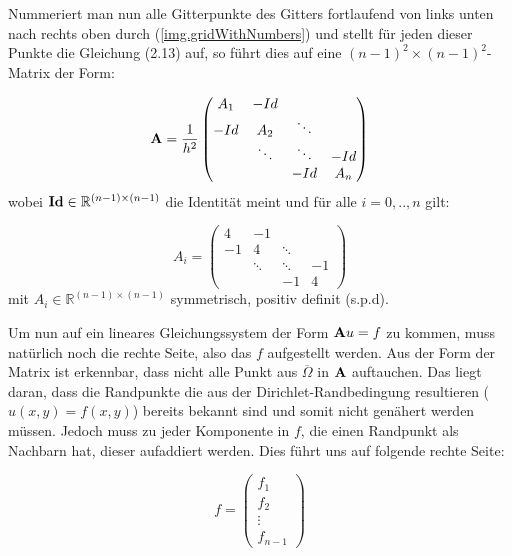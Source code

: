 \label{img.5-Point-Star}

\label{img.gridWithNumbers}

Nummeriert man nun alle Gitterpunkte des Gitters fortlaufend von links unten nach rechts oben durch (\autoref{img.gridWithNumbers}) und stellt für jeden dieser Punkte die Gleichung (2.13) auf, so führt dies auf eine $(n-1)^{2} \times (n-1)^{2}$-Matrix der Form:

\begin{equation}
{\textbf{A}} = \frac {1} {h^{2}}
\begin{pmatrix}
A_{1} & -Id \\
-Id & A_{2} & \ddots \\
 & \ddots & \ddots & -Id \\
 & & -Id & A_{n}
\end{pmatrix}
\end{equation}
wobei ${\textbf{Id}} \in \mathbb{R}^{(n-1) \times (n-1)}$ die Identität meint und für alle $i = 0,..,n$ gilt:

\begin{equation}
A_{i} = 
\begin{pmatrix}
4 & -1 & & \\
-1 & 4 & \ddots & \\
 & \ddots & \ddots & -1 \\
 & & -1 & 4
\end{pmatrix}
\end{equation}
mit $A_{i} \in \mathbb{R}^{(n-1) \times (n-1)}$ symmetrisch, positiv definit (s.p.d).

Um nun auf ein lineares Gleichungssystem der Form ${\textbf{A}}u = f$ zu kommen, muss natürlich noch die rechte Seite, also das $f$ aufgestellt werden. Aus der Form der Matrix ist erkennbar, dass nicht alle Punkt aus $\overline \Omega$ in ${\textbf{A}}$ auftauchen. Das liegt daran, dass die Randpunkte die aus der Dirichlet-Randbedingung resultieren ($u(x,y) = f(x,y)$) bereits bekannt sind und somit nicht genähert werden müssen. Jedoch muss zu jeder Komponente in $f$, die einen Randpunkt als Nachbarn hat, dieser aufaddiert werden. Dies führt uns auf folgende rechte Seite:

\begin{equation}
f = 
\begin{pmatrix}
f_{1} \\ f_{2} \\ \vdots \\ f_{n-1}
\end{pmatrix}
\end{equation}

